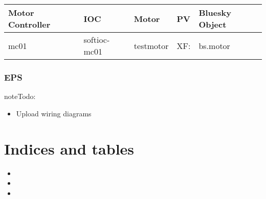 \documentclass[letterpaper,10pt,english]{sphinxmanual}
\begin{document}
\begin{savenotes}\sphinxattablestart
\raggedright
{}
\sphinxthecaptionisattop
{}\label{\detokenize{staff:xf05idd-ioc2}}
\sphinxaftertopcaption
\begin{tabulary}{\linewidth}[t]{|T|T|T|T|T|}
\hline
\sphinxstyletheadfamily 
Motor Controller
&\sphinxstyletheadfamily 
IOC
&\sphinxstyletheadfamily 
Motor
&\sphinxstyletheadfamily 
PV
&\sphinxstyletheadfamily 
Bluesky Object
\\
\hline
mc01
&
softioc-mc01
&
testmotor
&
XF:
&
bs.motor
\\
\hline
\end{tabulary}
\par
\sphinxattableend\end{savenotes}


\subsection{EPS}
\label{\detokenize{staff:eps}}
\begin{sphinxadmonition}{note}{\label{staff:index-5}Todo:}\begin{itemize}
\item {} 
Upload wiring diagrams

\end{itemize}
\end{sphinxadmonition}


\chapter{Indices and tables}
\label{\detokenize{index:indices-and-tables}}\begin{itemize}
\item {} 

\item {} 

\item {} 

\end{itemize}



\renewcommand{\indexname}{Index}
\printindex
\end{document}
